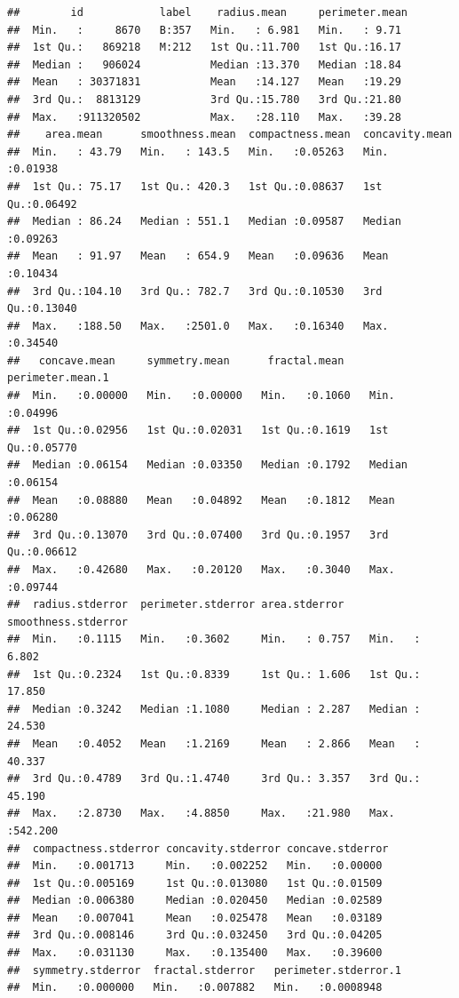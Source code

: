 \documentclass[]{article}
\begin{document}
\begin{verbatim}
##        id            label    radius.mean     perimeter.mean 
##  Min.   :     8670   B:357   Min.   : 6.981   Min.   : 9.71  
##  1st Qu.:   869218   M:212   1st Qu.:11.700   1st Qu.:16.17  
##  Median :   906024           Median :13.370   Median :18.84  
##  Mean   : 30371831           Mean   :14.127   Mean   :19.29  
##  3rd Qu.:  8813129           3rd Qu.:15.780   3rd Qu.:21.80  
##  Max.   :911320502           Max.   :28.110   Max.   :39.28  
##    area.mean      smoothness.mean  compactness.mean  concavity.mean   
##  Min.   : 43.79   Min.   : 143.5   Min.   :0.05263   Min.   :0.01938  
##  1st Qu.: 75.17   1st Qu.: 420.3   1st Qu.:0.08637   1st Qu.:0.06492  
##  Median : 86.24   Median : 551.1   Median :0.09587   Median :0.09263  
##  Mean   : 91.97   Mean   : 654.9   Mean   :0.09636   Mean   :0.10434  
##  3rd Qu.:104.10   3rd Qu.: 782.7   3rd Qu.:0.10530   3rd Qu.:0.13040  
##  Max.   :188.50   Max.   :2501.0   Max.   :0.16340   Max.   :0.34540  
##   concave.mean     symmetry.mean      fractal.mean    perimeter.mean.1 
##  Min.   :0.00000   Min.   :0.00000   Min.   :0.1060   Min.   :0.04996  
##  1st Qu.:0.02956   1st Qu.:0.02031   1st Qu.:0.1619   1st Qu.:0.05770  
##  Median :0.06154   Median :0.03350   Median :0.1792   Median :0.06154  
##  Mean   :0.08880   Mean   :0.04892   Mean   :0.1812   Mean   :0.06280  
##  3rd Qu.:0.13070   3rd Qu.:0.07400   3rd Qu.:0.1957   3rd Qu.:0.06612  
##  Max.   :0.42680   Max.   :0.20120   Max.   :0.3040   Max.   :0.09744  
##  radius.stderror  perimeter.stderror area.stderror    smoothness.stderror
##  Min.   :0.1115   Min.   :0.3602     Min.   : 0.757   Min.   :  6.802    
##  1st Qu.:0.2324   1st Qu.:0.8339     1st Qu.: 1.606   1st Qu.: 17.850    
##  Median :0.3242   Median :1.1080     Median : 2.287   Median : 24.530    
##  Mean   :0.4052   Mean   :1.2169     Mean   : 2.866   Mean   : 40.337    
##  3rd Qu.:0.4789   3rd Qu.:1.4740     3rd Qu.: 3.357   3rd Qu.: 45.190    
##  Max.   :2.8730   Max.   :4.8850     Max.   :21.980   Max.   :542.200    
##  compactness.stderror concavity.stderror concave.stderror 
##  Min.   :0.001713     Min.   :0.002252   Min.   :0.00000  
##  1st Qu.:0.005169     1st Qu.:0.013080   1st Qu.:0.01509  
##  Median :0.006380     Median :0.020450   Median :0.02589  
##  Mean   :0.007041     Mean   :0.025478   Mean   :0.03189  
##  3rd Qu.:0.008146     3rd Qu.:0.032450   3rd Qu.:0.04205  
##  Max.   :0.031130     Max.   :0.135400   Max.   :0.39600  
##  symmetry.stderror  fractal.stderror   perimeter.stderror.1
##  Min.   :0.000000   Min.   :0.007882   Min.   :0.0008948   

\end{verbatim}
\end{document}
